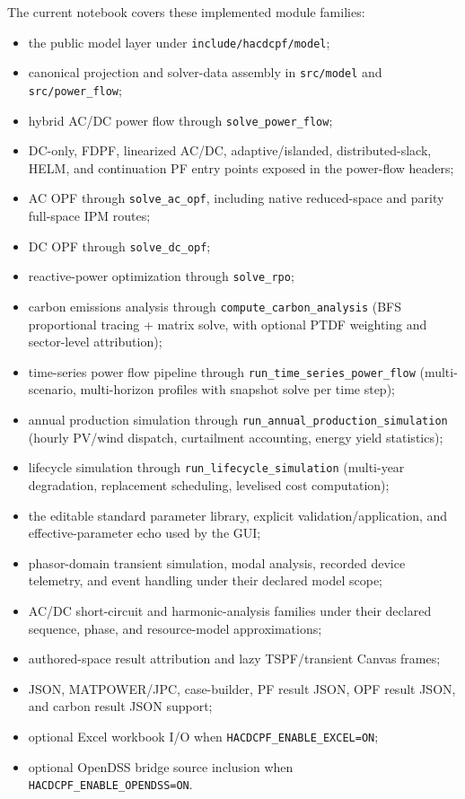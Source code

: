 The current notebook covers these implemented module families:
\begin{itemize}
  \item the public model layer under \texttt{include/hacdcpf/model};
  \item canonical projection and solver-data assembly in \texttt{src/model} and
  \texttt{src/power\_flow};
  \item hybrid AC/DC power flow through \texttt{solve\_power\_flow};
  \item DC-only, FDPF, linearized AC/DC, adaptive/islanded, distributed-slack,
  HELM, and continuation PF entry points exposed in the power-flow headers;
  \item AC OPF through \texttt{solve\_ac\_opf}, including native reduced-space
  and parity full-space IPM routes;
  \item DC OPF through \texttt{solve\_dc\_opf};
  \item reactive-power optimization through \texttt{solve\_rpo};
  \item carbon emissions analysis through \texttt{compute\_carbon\_analysis}
  (BFS proportional tracing + matrix solve, with optional PTDF weighting and
  sector-level attribution);
  \item time-series power flow pipeline through
  \texttt{run\_time\_series\_power\_flow} (multi-scenario, multi-horizon
  profiles with snapshot solve per time step);
  \item annual production simulation through
  \texttt{run\_annual\_production\_simulation} (hourly PV/wind dispatch,
  curtailment accounting, energy yield statistics);
  \item lifecycle simulation through \texttt{run\_lifecycle\_simulation}
  (multi-year degradation, replacement scheduling, levelised cost computation);
  \item the editable standard parameter library, explicit validation/application,
  and effective-parameter echo used by the GUI;
  \item phasor-domain transient simulation, modal analysis, recorded device
  telemetry, and event handling under their declared model scope;
  \item AC/DC short-circuit and harmonic-analysis families under their declared
  sequence, phase, and resource-model approximations;
  \item authored-space result attribution and lazy TSPF/transient Canvas frames;
  \item JSON, MATPOWER/JPC, case-builder, PF result JSON, OPF result JSON, and
  carbon result JSON support;
  \item optional Excel workbook I/O when \texttt{HACDCPF\_ENABLE\_EXCEL=ON};
  \item optional OpenDSS bridge source inclusion when
  \texttt{HACDCPF\_ENABLE\_OPENDSS=ON}.
\end{itemize}

